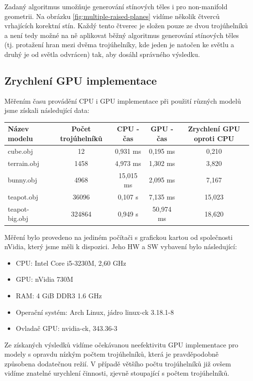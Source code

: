 \documentclass[11pt,a4paper]{article}
\begin{document}
Zadaný algoritmus umožňuje generování stínových těles i pro non-manifold geometrii. Na obrázku \ref{fig:multiple-raised-planes} vidíme několik čtverců vrhajících korektní stín. Každý tento čtverec je složen pouze ze dvou trojúhelníků a není tedy možné na ně aplikovat běžný algoritmus generování stínových těles (tj. protažení hran mezi dvěma trojúhelníky, kde jeden je natočen ke světlu a druhý je od světla odvrácen) tak, aby dosáhl správného výsledku.

\subsection{Zrychlení GPU implementace}

Měřením času provádění CPU i GPU implementace při použití různých modelů jsme získali následující data:

\begin{tabular}{l|c|c|c|c}
	Název modelu   & Počet trojúhelníků  & CPU - čas  & GPU - čas & Zrychlení GPU oproti CPU \\
	\hline
	cube.obj       & 12      & 0,931 ms   & 0,195 ms  & 0,210 \\
	terrain.obj    & 1458    & 4,973 ms   & 1,302 ms  & 3,820 \\ 
	bunny.obj      & 4968    & 15,015 ms  & 2,095 ms  & 7,167 \\
	teapot.obj     & 36096   & 0,107 s    & 7,135 ms  & 15,023 \\
	teapot-big.obj & 324864  & 0,949 s    & 50,974 ms & 18,620 \\
\end{tabular}

Měření bylo provedeno na jediném počítači s grafickou kartou od společnosti nVidia, který jsme měli k dispozici. Jeho HW a SW vybavení bylo následující:
\begin{itemize}
	\item CPU: Intel Core i5-3230M, 2,60 GHz
	\item GPU: nVidia 730M
	\item RAM: 4 GiB DDR3 1.6 GHz
	\item Operační systém: Arch Linux, jádro linux-ck 3.18.1-8
	\item Ovladač GPU: nvidia-ck, 343.36-3
\end{itemize}

Ze získaných výsledků vidíme očekávanou neefektivitu GPU implementace pro modely s opravdu nízkým počtem trojúhelníků, která je pravděpodobně způsobena dodatečnou režií. V případě většího počtu trojúhelníků již ovšem vidíme znatelné urychlení činnosti, zjevně stoupající s počtem trojúhelníků.
\end{document}
